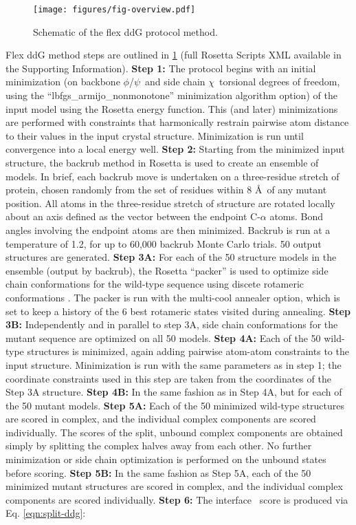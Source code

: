 \begin{figure}
  \centering
  \texttt{[image: figures/fig-overview.pdf]}
    \caption[]{
      Schematic of the flex ddG protocol method.
  } \label{fig:figure-overview}
\end{figure}

Flex ddG method steps are outlined in \cref{fig:figure-overview} (full Rosetta Scripts XML available in the Supporting Information).
\textbf{Step 1:} The protocol begins with an initial minimization (on backbone $\phi$/$\psi$\ and side chain $\chi$\ torsional degrees of freedom, using the ``lbfgs\_armijo\_nonmonotone'' minimization algorithm option) of the input model using the Rosetta energy function. This (and later) minimizations are performed with constraints that harmonically restrain pairwise atom distance to their values in the input crystal structure. Minimization is run until convergence into a local energy well.
\textbf{Step 2:} Starting from the minimized input structure, the backrub method in Rosetta is used to create an ensemble of models. In brief, each backrub move is undertaken on a three-residue stretch of protein, chosen randomly from the set of residues within 8 \AA\ of any mutant position. All atoms in the three-residue stretch of structure are rotated locally about an axis defined as the vector between the endpoint C-$\alpha$ atoms. Bond angles involving the endpoint atoms are then minimized. Backrub is run at a temperature of 1.2, for up to 60,000 backrub Monte Carlo trials. 50 output structures are generated.
\textbf{Step 3A:} For each of the 50 structure models in the ensemble (output by backrub), the Rosetta ``packer'' is used to optimize side chain conformations for the wild-type sequence using discete rotameric conformations \cite{shapovalov_smoothed_2011}. The packer is run with the multi-cool annealer option\cite{leaver-fay_generic_2011}, which is set to keep a history of the 6 best rotameric states visited during annealing.
\textbf{Step 3B:} Independently and in parallel to step 3A, side chain conformations for the mutant sequence are optimized on all 50 models.
\textbf{Step 4A:} Each of the 50 wild-type structures is minimized, again adding pairwise atom-atom constraints to the input structure. Minimization is run with the same parameters as in step 1; the coordinate constraints used in this step are taken from the coordinates of the Step 3A structure.
\textbf{Step 4B:} In the same fashion as in Step 4A, but for each of the 50 mutant models.
\textbf{Step 5A:} Each of the 50 minimized wild-type structures are scored in complex, and the individual complex components are scored individually. The scores of the split, unbound complex components are obtained simply by splitting the complex halves away from each other. No further minimization or side chain optimization is performed on the unbound states before scoring.
\textbf{Step 5B:} In the same fashion as Step 5A, each of the 50 minimized mutant structures are scored in complex, and the individual complex components are scored individually.
\textbf{Step 6:} The interface \ddg\ score is produced via Eq. \ref{eqn:split-ddg}:

